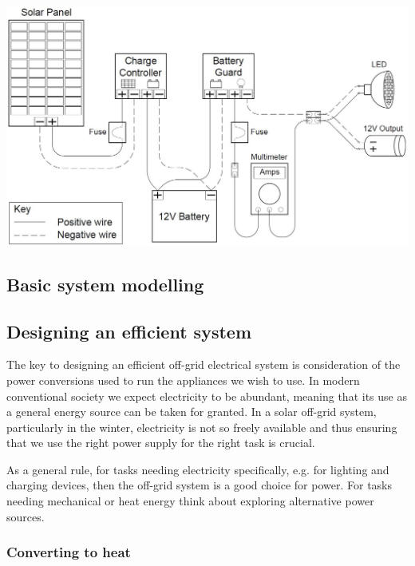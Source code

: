 \documentclass{article}
\theoremstyle{definition}
\theoremstyle{definition}
\theoremstyle{remark}
\begin{document}
  \begin{center}
    \includegraphics[width=0.75\paperwidth]{Images/image_11_2_(12v_system).png}
  \end{center}

  \subsection{Basic system modelling} %
  \label{sec:basic_system_modelling}
  

  \subsection{Designing an efficient system} %
  \label{sub:designing_an_efficient_system}

    The key to designing an efficient off-grid electrical system is consideration of the power conversions used to run the appliances we wish to use. In modern conventional society we expect electricity to be abundant, meaning that its use as a general energy source can be taken for granted. In a solar off-grid system, particularly in the winter, electricity is not so freely available and thus ensuring that we use the right power supply for the right task is crucial. 

    As a general rule, for tasks needing electricity specifically, e.g. for lighting and charging devices, then the off-grid system is a good choice for power. For tasks needing mechanical or heat energy think about exploring alternative power sources.

    \subsubsection{Converting to heat} %
    \label{ssub:converting_to_heat}
\end{document}
